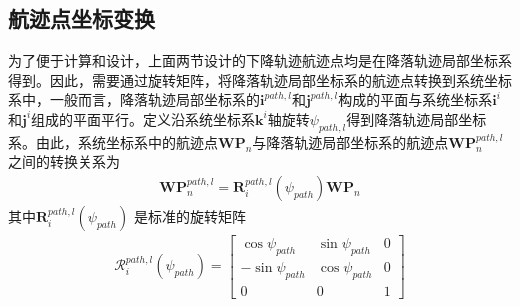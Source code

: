\subsection{航迹点坐标变换}
为了便于计算和设计，上面两节设计的下降轨迹航迹点均是在降落轨迹局部坐标系得到。因此，需要通过旋转矩阵，将降落轨迹局部坐标系的航迹点转换到系统坐标系中，一般而言，降落轨迹局部坐标系的$\mathbf{i}^{path,l}$和$\mathbf{j}^{path,l}$构成的平面与系统坐标系$\mathbf{i}^{i}$和$\mathbf{j}^{i}$组成的平面平行。定义沿系统坐标系$\mathbf{k}^{i}$轴旋转$\psi_{path,l}$得到降落轨迹局部坐标系。由此，系统坐标系中的航迹点$\mathbf{WP}_n$与降落轨迹局部坐标系的航迹点$\mathbf{WP}_n^{path,l}$之间的转换关系为
\begin{align}
\mathbf{WP}_n^{path,l} = \mathbf{R}_i^{path,l}(\psi_{path}) \mathbf{WP}_n
\end{align}
其中$ \mathbf{R}_i^{path,l}(\psi_{path}) $ 是标准的旋转矩阵
\begin{align}
\mathcal{R}_i^{path,l}(\psi_{path}) = \begin{bmatrix} \cos \psi_{path}  & \sin \psi_{path}  &  0      \\  - \sin \psi_{path} & \cos \psi_{path}   &0 \\  0   & 0 &1  \end{bmatrix}
\end{align}
​
%



